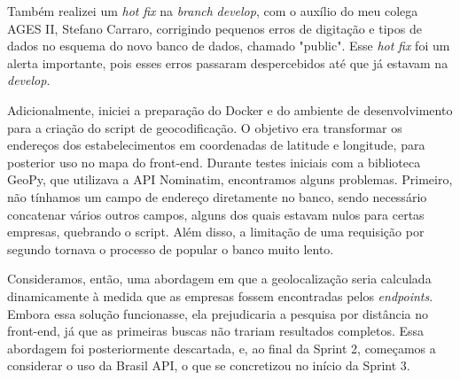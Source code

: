 \indent Também realizei um \textit{hot} \textit{fix} na \textit{branch} \textit{develop}, com o auxílio do meu colega AGES II, Stefano Carraro, corrigindo pequenos erros de digitação e tipos de dados no esquema do novo banco de dados, chamado "public". Esse \textit{hot}\textit{ fix} foi um alerta importante, pois esses erros passaram despercebidos até que já estavam na \textit{develop}.\par

\indent Adicionalmente, iniciei a preparação do Docker e do ambiente de desenvolvimento para a criação do script de geocodificação. O objetivo era transformar os endereços dos estabelecimentos em coordenadas de latitude e longitude, para posterior uso no mapa do front-end. Durante testes iniciais com a biblioteca GeoPy, que utilizava a API Nominatim, encontramos alguns problemas. Primeiro, não tínhamos um campo de endereço diretamente no banco, sendo necessário concatenar vários outros campos, alguns dos quais estavam nulos para certas empresas, quebrando o script. Além disso, a limitação de uma requisição por segundo tornava o processo de popular o banco muito lento.\par

\indent Consideramos, então, uma abordagem em que a geolocalização seria calculada dinamicamente à medida que as empresas fossem encontradas pelos \textit{endpoints}. Embora essa solução funcionasse, ela prejudicaria a pesquisa por distância no front-end, já que as primeiras buscas não trariam resultados completos. Essa abordagem foi posteriormente descartada, e, ao final da Sprint 2, começamos a considerar o uso da Brasil API, o que se concretizou no início da Sprint 3.\par

